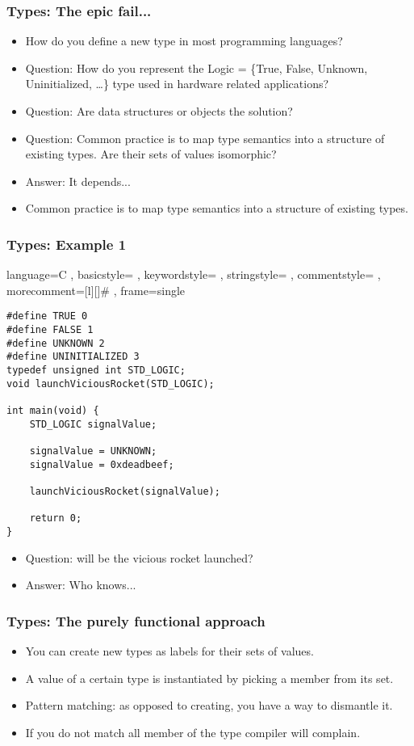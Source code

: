 \documentclass[11pt]{beamer}
\begin{document}
	\begin{frame}
		\frametitle{Types: The epic fail...}
			\begin{itemize}[<+->]
				\item How do you define a new type in most programming languages?
				\item Question: How do you represent the Logic = \{True, False, Unknown, Uninitialized, \ldots \} type used in hardware related applications?
				\item Question: Are data structures or objects the solution?
				\item Question: Common practice is to map type semantics into a structure of existing types. Are their sets of values isomorphic?
				\item Answer: It depends...
				\item Common practice is to map type semantics into a structure of existing types.
			\end{itemize}
	\end{frame}

\begin{frame}[fragile]
\frametitle{Types: Example 1}

\lstset
	{ language=C
	, basicstyle=\ttfamily\footnotesize
	, keywordstyle=\color{blue}\ttfamily
	, stringstyle=\color{red}\ttfamily
	, commentstyle=\color{green}\ttfamily
	, morecomment=[l][\color{magenta}]{\#}
	, frame=single
}

\begin{lstlisting}
#define TRUE 0
#define FALSE 1
#define UNKNOWN 2
#define UNINITIALIZED 3
typedef unsigned int STD_LOGIC;
void launchViciousRocket(STD_LOGIC);

int main(void) {
	STD_LOGIC signalValue;

	signalValue = UNKNOWN;
	signalValue = 0xdeadbeef;

	launchViciousRocket(signalValue);
	
	return 0;
}
\end{lstlisting}

\begin{itemize}[<+->]
	\item Question: will be the vicious rocket launched?
	\item Answer: Who knows...
\end{itemize}
\end{frame}

	\begin{frame}
		\frametitle{Types: The purely functional approach}
			\begin{itemize}[<+->]
				\item You can create new types as labels for their sets of values.
				\item A value of a certain type is instantiated by picking a member from its set.
				\item Pattern matching: as opposed to creating, you have a way to dismantle it.
				\item If you do not match all member of the type compiler will complain.
			\end{itemize}
	\end{frame}
\end{document}
